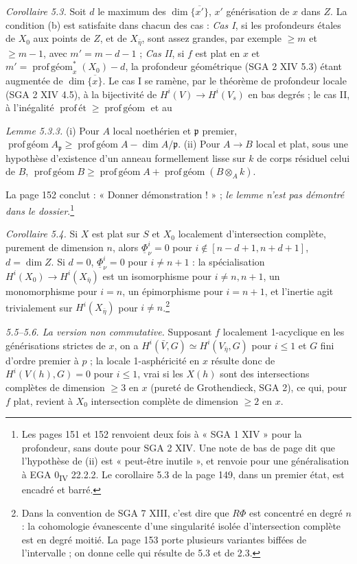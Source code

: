 \documentclass[11pt,a4paper]{article}
\begin{document}
\emph{Corollaire 5.3.} Soit $d$ le maximum des $\dim\overline{\{x'\}}$, $x'$
générisation de $x$ dans $Z$. La condition (b) est satisfaite dans chacun des cas :
\emph{Cas I}, si les profondeurs étales de $X_0$ aux points de $Z$, et de
$X_{\bar\eta}$, sont assez grandes, par exemple $\geq m$ et $\geq m - 1$, avec
$m' = m - d - 1$ ; \emph{Cas II}, si $f$ est plat en $x$ et
$m' = \operatorname{prof\,géom}^*_x(X_0) - d$, la profondeur géométrique
(SGA 2 XIV 5.3) étant augmentée de $\dim\overline{\{x\}}$. Le cas I se ramène,
par le théorème de profondeur locale (SGA 2 XIV 4.5), à la bijectivité de
$H^i(V) \to H^i(V_s)$ en bas degrés ; le cas II, à l'inégalité
$\operatorname{prof\,ét} \geq \operatorname{prof\,géom}$ et au

\emph{Lemme 5.3.3.} (i) Pour $A$ local noethérien et $\mathfrak{p}$ premier,
$\operatorname{prof\,géom} A_{\mathfrak{p}} \geq \operatorname{prof\,géom} A -
\dim A/\mathfrak{p}$. (ii) Pour $A \to B$ local et plat, sous une hypothèse
d'existence d'un anneau formellement lisse sur $k$ de corps résiduel celui de
$B$, $\operatorname{prof\,géom} B \geq \operatorname{prof\,géom} A +
\operatorname{prof\,géom}(B \otimes_A k)$.

La page 152 conclut : « Donner démonstration ! » ; \emph{le lemme n'est pas
démontré dans le dossier}.\footnote{Les pages 151 et 152 renvoient deux fois à
« SGA 1 XIV » pour la profondeur, sans doute pour SGA 2 XIV. Une note de bas de
page dit que l'hypothèse de (ii) est « peut-être inutile », et renvoie pour une
généralisation à EGA 0\textsubscript{IV} 22.2.2. Le corollaire 5.3 de la page
149, dans un premier état, est encadré et barré.}

\emph{Corollaire 5.4.} Si $X$ est plat sur $S$ et $X_0$ localement d'intersection
complète, purement de dimension $n$, alors $\underline\Phi^i_\nu = 0$ pour
$i \notin [n - d + 1, n + d + 1]$, $d = \dim Z$. Si $d = 0$,
$\underline\Phi^i_\nu = 0$ pour $i \neq n + 1$ : la spécialisation
$H^i(X_0) \to H^i(X_{\bar\eta})$ est un isomorphisme pour $i \neq n, n+1$, un
monomorphisme pour $i = n$, un épimorphisme pour $i = n+1$, et l'inertie agit
trivialement sur $H^i(X_{\bar\eta})$ pour $i \neq n$.\footnote{Dans la convention
de SGA 7 XIII, c'est dire que $R\Phi$ est concentré en degré $n$ : la
cohomologie évanescente d'une singularité isolée d'intersection complète est en
degré moitié. La page 153 porte plusieurs variantes biffées de l'intervalle ; on
donne celle qui résulte de 5.3 et de 2.3.}

\emph{5.5--5.6. La version non commutative.} Supposant $f$ localement
1-acyclique en les générisations strictes de $x$, on a $H^i(\bar V, G) \simeq
H^i(V_{\bar\eta}, G)$ pour $i \leq 1$ et $G$ fini d'ordre premier à $p$ ; la
locale 1-asphéricité en $x$ résulte donc de $H^i(V(h), G) = 0$ pour $i \leq 1$,
vrai si les $X(h)$ sont des intersections complètes de dimension $\geq 3$ en $x$
(pureté de Grothendieck, SGA 2), ce qui, pour $f$ plat, revient à $X_0$
intersection complète de dimension $\geq 2$ en $x$.
\end{document}

